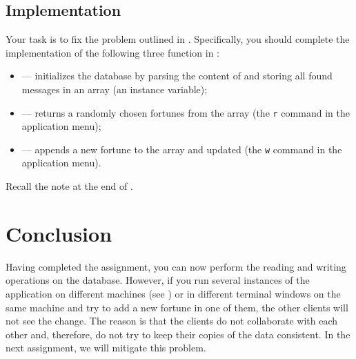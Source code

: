 \documentclass[a4paper,10pt]{article}
\begin{document}
\subsection{Implementation}
Your task is to fix the problem outlined in . Specifically,
you should complete the implementation of the following three function in
:
\begin{itemize}

  \item {} --- initializes the database by parsing the content
  of  and storing all found messages in an array (an
  instance variable);

  \item {} --- returns a randomly chosen fortunes from the array (the
  \texttt{r} command in the application menu);

  \item {} --- appends a new fortune to the array and updated
   (the \texttt{w} command in the application menu).

\end{itemize}
Recall the note at the end of .

\section{Conclusion}
Having completed the assignment, you can now perform the reading and writing
operations on the database. However, if you run several instances of the
application on different machines (see ) or in different
terminal windows on the same machine and try to add a new fortune in one of
them, the other clients will not see the change. The reason is that the clients
do not collaborate with each other and, therefore, do not try to keep their
copies of the data consistent. In the next assignment, we will mitigate this
problem.

\printbibliography
\end{document}
